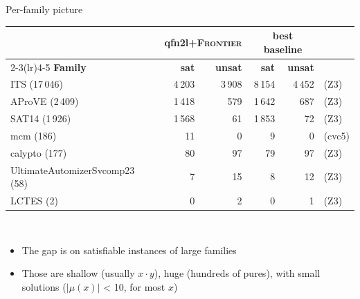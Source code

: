 \documentclass[11pt]{beamer}
\newcommand{\solver}{\textsf{qfn2l}}
\begin{document}
\begin{frame}{Per-family picture}
	\begin{center}
		\scriptsize
		\begin{tabular}{l rr @{\hskip 1.2em} rr l}
			\toprule
			                               & \multicolumn{2}{c}{\textbf{\solver{}+\textsc{Frontier}}} & \multicolumn{2}{c}{\textbf{best baseline}}                                          \\
			\cmidrule(lr){2-3}\cmidrule(lr){4-5}
			\textbf{Family}                & \textbf{sat}                                             & \textbf{unsat}                             & \textbf{sat} & \textbf{unsat} &        \\
			\midrule
			ITS (17\,046)                  & 4\,203                                                   & 3\,908                                     & 8\,154       & 4\,452         & (Z3)   \\
			AProVE (2\,409)                & 1\,418                                                   & 579                                        & 1\,642       & 687            & (Z3)   \\
			SAT14 (1\,926)                 & 1\,568                                                   & 61                                         & 1\,853       & 72             & (Z3)   \\
			\midrule
			mcm (186)                      & \alert{11}                                               & \alert{0}                                  & 9            & 0              & (cvc5) \\
			calypto (177)                  & \alert{80}                                               & \alert{97}                                 & 79           & 97             & (Z3)   \\
			UltimateAutomizerSvcomp23 (58) & \alert{7}                                                & \alert{15}                                 & 8            & 12             & (Z3)   \\
			LCTES (2)                      & \alert{0}                                                & \alert{2}                                  & 0            & 1              & (Z3)   \\
			\bottomrule
		\end{tabular}\\[0.4em]
	\end{center}
	\begin{itemize}
		\item The gap is on \alert{satisfiable} instances of large families
		\item Those are shallow (usually $x\cdot y$), huge (hundreds of pures), with small solutions
			($|\mu(x)|$ < 10, for most $x$)
	\end{itemize}
\end{frame}
\end{document}
